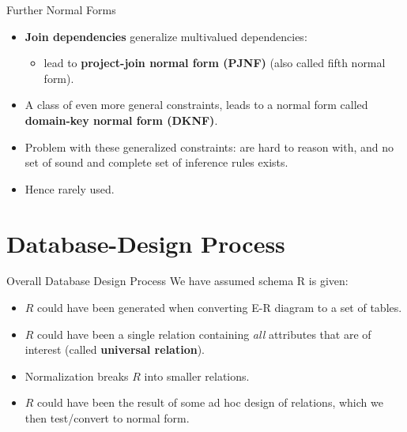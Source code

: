 \documentclass[aspectratio=169]{beamer}
\begin{document}
\begin{frame}{Further Normal Forms}
    \begin{itemize}
        \item \textbf{Join dependencies} generalize multivalued dependencies:
            \begin{itemize}
                \item lead to \textbf{project-join normal form (PJNF)} (also called fifth normal form).
            \end{itemize}
        \item A class of even more general constraints, leads to a normal form called \textbf{domain-key normal form (DKNF)}.
        \item Problem with these generalized constraints: are hard to reason with, and no set of sound and complete set of inference rules exists.
        \item Hence rarely used.
    \end{itemize}
\end{frame}

\section{Database-Design Process}

\begin{frame}{Overall Database Design Process}
    We have assumed schema R is given:
        \begin{itemize}
            \item $R$ could have been generated when converting E-R diagram to a set of tables.
            \item $R$ could have been a single relation containing \textit{all} attributes that are of interest (called \textbf{universal relation}).
            \item Normalization breaks $R$ into smaller relations.
            \item $R$ could have been the result of some ad hoc design of relations, which we then test/convert to normal form.
        \end{itemize}
\end{frame}
\end{document}
